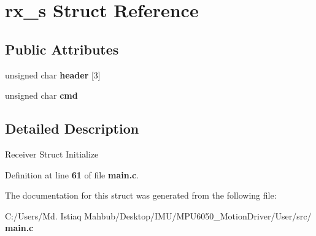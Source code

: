 \section{rx\+\_\+s Struct Reference}
\label{structrx__s}
\subsection*{Public Attributes}
\begin{DoxyCompactItemize}
\item 
unsigned char \textbf{ header} [3]
\item 
unsigned char \textbf{ cmd}
\end{DoxyCompactItemize}


\subsection{Detailed Description}
Receiver Struct Initialize 

Definition at line \textbf{ 61} of file \textbf{ main.\+c}.



The documentation for this struct was generated from the following file\+:\begin{DoxyCompactItemize}
\item 
C\+:/\+Users/\+Md. Istiaq Mahbub/\+Desktop/\+I\+M\+U/\+M\+P\+U6050\+\_\+\+Motion\+Driver/\+User/src/\textbf{ main.\+c}\end{DoxyCompactItemize}
